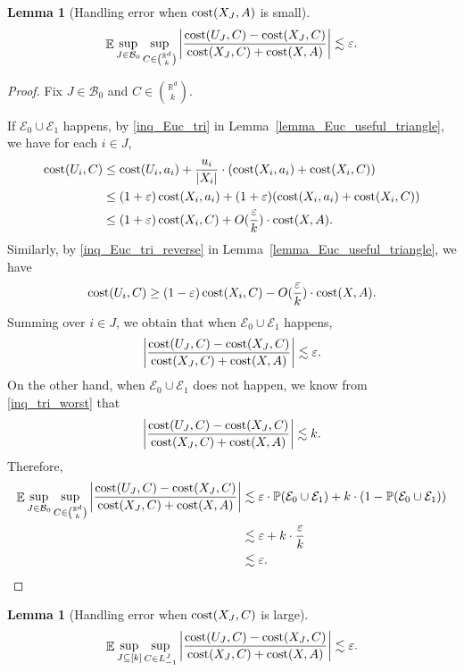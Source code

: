\documentclass[11pt,letterpaper]{article}
\newtheorem{lemma}[theorem]{Lemma}
\theoremstyle{definition}
\newcommand{\eps}{\varepsilon}
\DeclareMathOperator*{\E}{\ensuremath{\mathbb{E}}}
\DeclarePairedDelimiter{\abs}{\lvert}{\rvert}
\begin{document}
\begin{lemma}[Handling error when $\cost(X_J, A)$ is small]
\label{lemma_EUC_chaining_minorcase0}
\begin{eqnarray*}
\E\sup_{J\in \mathcal{B}_0}\sup_{C\in \binom{\mathbb{R}^d}{k}} \bigg|\frac{\cost(U_J,C)-\cost(X_J,C)}{\cost(X_J,C)+\cost(X,A)}\bigg|\lesssim \eps.
\end{eqnarray*}
\end{lemma}
\begin{proof}
Fix $J\in \mathcal{B}_0$ and $C\in \binom{\mathbb{R}^d}{k}$.


If $\mathcal{E}_0\cup\mathcal{E}_1$ happens, by \eqref{inq_Euc_tri} in  Lemma~\ref{lemma_Euc_useful_triangle}, we have  for each $i\in J$,
\begin{align*}
\cost(U_i,C)&\leq \cost(U_i,a_i)+\frac{u_i}{|X_i|}\cdot (\cost(X_i,a_i)+\cost(X_i,C))\\
&\leq
(1+\eps)  \cost(X_i,a_i)+(1+\eps)(\cost(X_i,a_i)+\cost(X_i,C))\\
&\leq (1+\eps) \cost(X_i,C)+O(\frac{\eps}{k})\cdot \cost(X,A).
\end{align*}
%
Similarly, by \eqref{inq_Euc_tri_reverse} in Lemma~\ref{lemma_Euc_useful_triangle}, we have
$$
\cost(U_i,C)\geq (1-\eps) \cost(X_i,C)-O(\frac{\eps}{k}) \cdot \cost(X,A).
$$
%
Summing over $i\in J$, we obtain that when $\mathcal{E}_0\cup\mathcal{E}_1$ happens,
$$
\abs*{ \frac{\cost(U_J,C)-\cost(X_J,C)}{\cost(X_J,C)+\cost(X,A)} }\lesssim \eps.
$$
%
On the other hand, when $\mathcal{E}_0\cup\mathcal{E}_1$ does not happen, we know from \eqref{inq_tri_worst} that
$$
\abs*{ \frac{\cost(U_J,C)-\cost(X_J,C)}{\cost(X_J,C)+\cost(X,A)} }\lesssim k.
$$
Therefore,
\begin{align*}
 \E\sup_{J\in \mathcal{B}_0}\sup_{C\in \binom{\mathbb{R}^d}{k}} \bigg|\frac{\cost(U_J,C)-\cost(X_J,C)}{\cost(X_J,C)+\cost(X,A)}\bigg|
&\lesssim  \eps\cdot \mathbb{P}(\mathcal{E}_0\cup\mathcal{E}_1)+k\cdot (1-\mathbb{P}(\mathcal{E}_0\cup\mathcal{E}_1))\\
&\lesssim  \eps+k\cdot\frac{\eps}{k}\\
&\lesssim \eps. \qedhere
\end{align*}
\end{proof}

\begin{lemma}[Handling error when $\cost(X_J, C)$ is large] 
\label{lemma_Euc_chaining_minorcases1}
\begin{eqnarray*}
\E\sup_{J\subseteq [k]}\sup_{C\in L^J_{-1}} \bigg|\frac{\cost(U_J,C)-\cost(X_J,C)}{\cost(X_J,C)+\cost(X,A)}\bigg|\lesssim \eps.
\end{eqnarray*}
\end{lemma}
\end{document}
